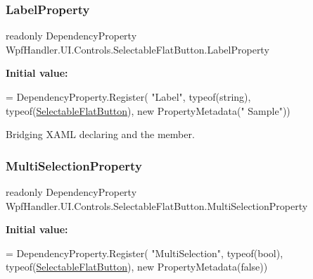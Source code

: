 \subsubsection{\texorpdfstring{Label\+Property}{LabelProperty}}
{\footnotesize\ttfamily readonly Dependency\+Property Wpf\+Handler.\+U\+I.\+Controls.\+Selectable\+Flat\+Button.\+Label\+Property\hspace{0.3cm}{\ttfamily [static]}}

{\bfseries Initial value\+:}
\begin{DoxyCode}
= DependencyProperty.Register(
          \textcolor{stringliteral}{"Label"}, typeof(\textcolor{keywordtype}{string}), typeof(\mbox{\hyperlink{class_wpf_handler_1_1_u_i_1_1_controls_1_1_selectable_flat_button_a05bd4f4c7754212984b77499922a275d}{SelectableFlatButton}}), \textcolor{keyword}{new} PropertyMetadata(\textcolor{stringliteral}{"
      Sample"}))
\end{DoxyCode}


Bridging X\+A\+ML declaring and the member. 

\mbox{\label{class_wpf_handler_1_1_u_i_1_1_controls_1_1_selectable_flat_button_a5765829144f2d6ff2f76b972940ec242}} 
\subsubsection{\texorpdfstring{Multi\+Selection\+Property}{MultiSelectionProperty}}
{\footnotesize\ttfamily readonly Dependency\+Property Wpf\+Handler.\+U\+I.\+Controls.\+Selectable\+Flat\+Button.\+Multi\+Selection\+Property\hspace{0.3cm}{\ttfamily [static]}}

{\bfseries Initial value\+:}
\begin{DoxyCode}
= DependencyProperty.Register(
          \textcolor{stringliteral}{"MultiSelection"}, typeof(\textcolor{keywordtype}{bool}), typeof(\mbox{\hyperlink{class_wpf_handler_1_1_u_i_1_1_controls_1_1_selectable_flat_button_a05bd4f4c7754212984b77499922a275d}{SelectableFlatButton}}), \textcolor{keyword}{new} 
      PropertyMetadata(\textcolor{keyword}{false}))
\end{DoxyCode}


